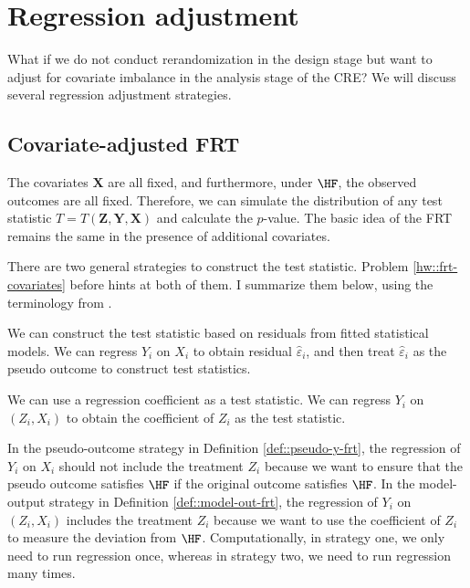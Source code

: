 \section{Regression adjustment}

What if we do not conduct rerandomization in the design stage but want to adjust for covariate imbalance in the analysis stage of the CRE? We will discuss several regression adjustment strategies. 

\subsection{Covariate-adjusted FRT}\label{sec::covariate-adjusted-frt-intro}


The covariates $\bm{X}$ are all fixed, and furthermore, under $\HF$, the observed outcomes are all fixed. Therefore, we can simulate the distribution of any test statistic $T = T(\bm{Z}, \bm{Y}, \bm{X})$ and calculate the $p$-value. The basic idea of the FRT remains the same in the presence of additional covariates.  


There are two general strategies to construct the test statistic. Problem \ref{hw::frt-covariates} before hints at both of them. I summarize them below, using the terminology from \citet{zhao2020caFRT}. 


\begin{definition}
\label{def::pseudo-y-frt}
We can construct the test statistic based on residuals from fitted statistical models. We can regress $Y_i$ on $X_i$ to obtain residual $\hat \varepsilon_i$, and then treat $\hat \varepsilon_i$ as the pseudo outcome to construct test statistics.
\end{definition}



\begin{definition}
\label{def::model-out-frt}
We can use a regression coefficient as a test statistic. We can regress  $Y_i$ on $(Z_i, X_i)$ to obtain the coefficient of $Z_i$ as the test statistic.
\end{definition}

 

In the pseudo-outcome strategy in Definition \ref{def::pseudo-y-frt}, the regression of $Y_i$ on $X_i$ should not include the treatment $Z_i$ because we want to ensure that the pseudo outcome satisfies $\HF$ if the original outcome satisfies $\HF$. 
In the model-output strategy in Definition \ref{def::model-out-frt}, the regression of $Y_i$ on $(Z_i, X_i)$ includes the treatment $Z_i$ because we want to use the coefficient of $Z_i$ to measure the deviation from $\HF$.  
Computationally, in strategy one, we only need to run regression once, whereas in strategy two, we need to run regression many times. 

